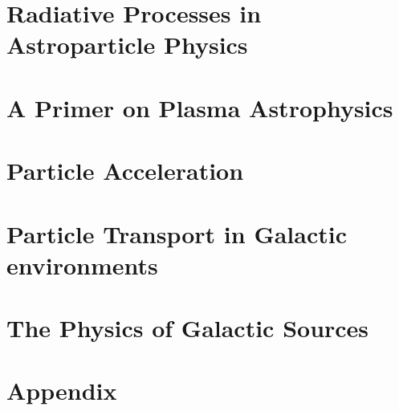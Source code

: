 \documentclass[letterpaper, 11pt, notitlepage]{report}
\begin{document}
\newpage

\tableofcontents\label{sec:contents}

\chapter{Radiative Processes in Astroparticle Physics}


\newpage

\chapter{A Primer on Plasma Astrophysics}




\newpage

\chapter{Particle Acceleration}

\newpage

\chapter{Particle Transport in Galactic environments}



\newpage

\chapter{The Physics of Galactic Sources}

\newpage

\appendix

\newpage
\chapter{Appendix}





\newpage



\end{document}
